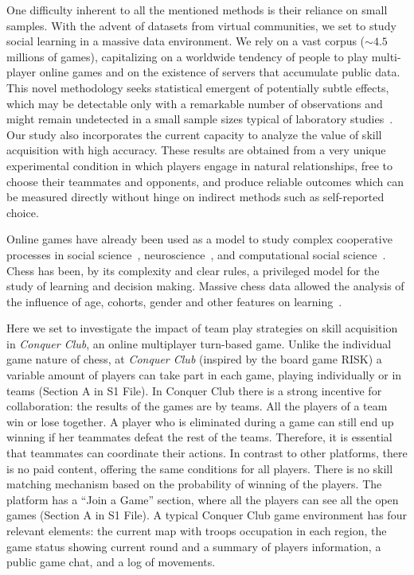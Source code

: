 \documentclass[a4paper,10pt]{book}
\theoremstyle{definition}
\begin{document}
One difficulty inherent to all the mentioned methods is their reliance on small samples.
With the advent of datasets from virtual communities, we set to study social learning in a massive data environment.
We rely on a vast corpus ($\sim4.5$ millions of games), capitalizing on a worldwide tendency of people to play multi-player online games and on the existence of servers that accumulate public data.
This novel methodology seeks statistical emergent of potentially subtle effects, which may be detectable only with a remarkable number of observations and might remain undetected in a small sample sizes typical of laboratory studies~\cite{slezak2012-doNotFearYourOpponent}.
Our study also incorporates the current capacity to analyze the value of skill acquisition with high accuracy.
These results are obtained from a very unique experimental condition in which players engage in natural relationships, free to choose their teammates and opponents, and produce reliable outcomes which can be measured directly without hinge on indirect methods such as self-reported choice.

Online games have already been used as a model to study complex cooperative processes in social science~\cite{Beheim2014,Johnson2009-onlineGuildsOfflineGangs}, neuroscience~\cite{slezak2012-doNotFearYourOpponent,sigman2010-chess}, and computational social science~\cite{delong2013-phd_teamChemistry,roy2013-socializationAndTrustFormation,borbora2012-churnPredictionOnlineGames,shim2010-teamPerformancePrediction}.  
Chess has been, by its complexity and clear rules, a privileged model for the study of learning and decision making.
Massive chess data allowed the analysis of the influence of age, cohorts, gender and other features on learning~\cite{chabris_glickman2006-sexDifferencesChessPerformance,roring2007-expertiseInChessAcrossLifeSpan,stafford2014-skillLearningOnlineGame,howard2014-learningCurvesChessPlayersATestOfPowerLawGenerality,gaschler2014-playingOffThePredictedLearningCurve,vaci2016-chessDatabasesAgePerformance}.

Here we set to investigate the impact of team play strategies on skill acquisition in \emph{Conquer Club}, an online multiplayer turn-based game.
Unlike the individual game nature of chess, at \emph{Conquer Club} (inspired by the board game RISK) a variable amount of players can take part in each game, playing individually or in teams (Section A in S1 File).
In Conquer Club there is a strong incentive for collaboration: the results of the games are by teams.
All the players of a team win or lose together.
A player who is eliminated during a game can still end up winning if her teammates defeat the rest of the teams.
Therefore, it is essential that teammates can coordinate their actions.
In contrast to other platforms, there is no paid content, offering the same conditions for all players.
There is no skill matching mechanism based on the probability of winning of the players.
The platform has a ``Join a Game'' section, where all the players can see all the open games (Section A in S1 File).
A typical Conquer Club game environment has four relevant elements: the current map with troops occupation in each region, the game status showing current round and a summary of players information, a public game chat, and a log of movements.
\end{document}
